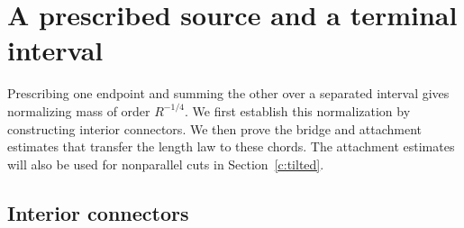 \section{A prescribed source and a terminal interval}\label{c:window}
Prescribing one endpoint and summing the other over a separated interval
gives normalizing mass of order $R^{-1/4}$. We first establish this
normalization by constructing interior connectors. We then prove the
bridge and attachment estimates that transfer the length law to these
chords. The attachment estimates will also be used for nonparallel cuts
in Section~\ref{c:tilted}.

\subsection{Interior connectors}

